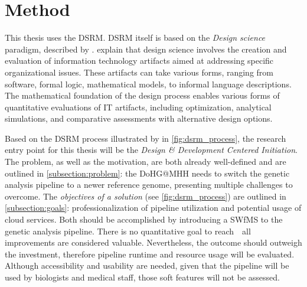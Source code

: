 \section{Method}

This thesis uses the \acf{DSRM}. \Ac{DSRM} itself is based on the \textit{Design science} paradigm, described by \citeauthor{Simon1988} \autocite{Simon1988}. \citeauthor{Hevner2004} \autocite{Hevner2004} explain that design science involves the creation and evaluation of information technology artifacts aimed at addressing specific organizational issues. These artifacts can take various forms, ranging from software, formal logic, mathematical models, to informal language descriptions. The mathematical foundation of the design process enables various forms of quantitative evaluations of IT artifacts, including optimization, analytical simulations, and comparative assessments with alternative design options.

Based on the \ac{DSRM} process illustrated by \citeauthor{Peffers2007} in \cref{fig:dsrm_process}, the research entry point for this thesis will be the \textit{Design \& Development Centered Initiation}. The problem, as well as the motivation, are both already well-defined and are outlined in \cref{subsection:problem}: the \ac{DoHG@MHH} needs to switch the genetic analysis pipeline to a newer reference genome, presenting multiple challenges to overcome. The \textit{objectives of a solution} (see \cref{fig:dsrm_process}) are outlined in \cref{subsection:goals}: professionalization of pipeline utilization and potential usage of cloud services. Both should be accomplished by introducing a \ac{SWfMS} to the genetic analysis pipeline. There is no quantitative goal to reach~\textemdash~all improvements are considered valuable. Nevertheless, the outcome should outweigh the investment, therefore pipeline runtime and resource usage will be evaluated. Although accessibility and usability are needed, given that the pipeline will be used by biologists and medical staff, those soft features will not be assessed.

